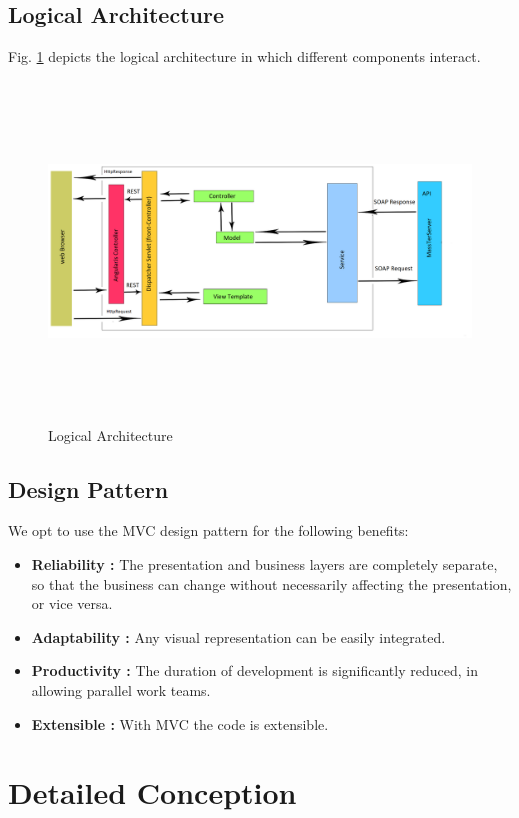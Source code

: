 	\subsection{Logical Architecture}
 Fig. \ref{logicalArchitecture}	depicts the logical architecture in which different components interact.
\begin{figure}[h]
	\centering
	\includegraphics[width=17.5cm,height=9cm]{logicalArchitecture.png}
	\caption{Logical Architecture}
	\label{logicalArchitecture}
\end{figure} 
	
	\subsection{Design Pattern}
		We opt to use the MVC design pattern for the following benefits:
	\begin{itemize}
		\item \textbf{Reliability : }The presentation and business layers are completely separate, so that the business can change without necessarily affecting the presentation, or vice versa.
		\item \textbf{Adaptability : }Any visual representation can be easily integrated.
		\item \textbf{Productivity : }The duration of development is significantly reduced, in allowing parallel work teams.
		\item \textbf{Extensible : } With MVC the code is extensible.
	\end{itemize}

	\clearpage
    \newpage

	\section{Detailed Conception}
